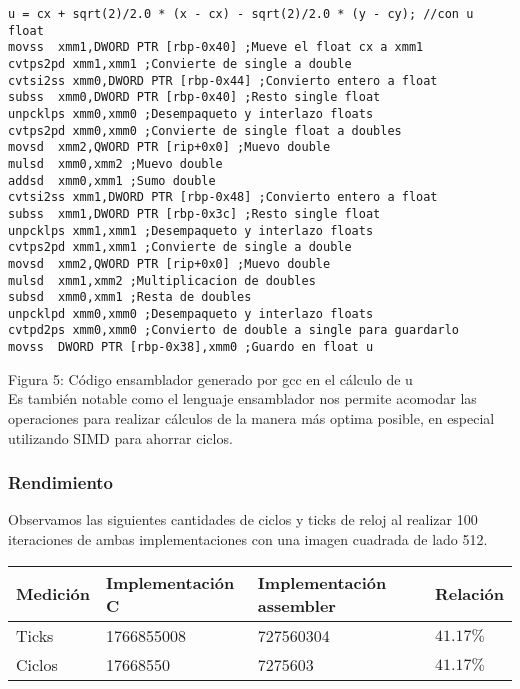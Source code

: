 \begin{verbatim}
u = cx + sqrt(2)/2.0 * (x - cx) - sqrt(2)/2.0 * (y - cy); //con u float
movss  xmm1,DWORD PTR [rbp-0x40] ;Mueve el float cx a xmm1
cvtps2pd xmm1,xmm1 ;Convierte de single a double
cvtsi2ss xmm0,DWORD PTR [rbp-0x44] ;Convierto entero a float
subss  xmm0,DWORD PTR [rbp-0x40] ;Resto single float
unpcklps xmm0,xmm0 ;Desempaqueto y interlazo floats
cvtps2pd xmm0,xmm0 ;Convierte de single float a doubles
movsd  xmm2,QWORD PTR [rip+0x0] ;Muevo double
mulsd  xmm0,xmm2 ;Muevo double
addsd  xmm0,xmm1 ;Sumo double
cvtsi2ss xmm1,DWORD PTR [rbp-0x48] ;Convierto entero a float
subss  xmm1,DWORD PTR [rbp-0x3c] ;Resto single float
unpcklps xmm1,xmm1 ;Desempaqueto y interlazo floats
cvtps2pd xmm1,xmm1 ;Convierte de single a double
movsd  xmm2,QWORD PTR [rip+0x0] ;Muevo double
mulsd  xmm1,xmm2 ;Multiplicacion de doubles
subsd  xmm0,xmm1 ;Resta de doubles
unpcklpd xmm0,xmm0 ;Desempaqueto y interlazo floats
cvtpd2ps xmm0,xmm0 ;Convierto de double a single para guardarlo
movss  DWORD PTR [rbp-0x38],xmm0 ;Guardo en float u
\end{verbatim}

Figura 5: Código ensamblador generado por gcc en el cálculo de u \\

Es también notable como el lenguaje ensamblador nos permite acomodar las operaciones para realizar cálculos de la manera más optima posible, en especial utilizando SIMD para ahorrar ciclos.

\subsubsection{Rendimiento}
Observamos las siguientes cantidades de ciclos y ticks de reloj al realizar 100 iteraciones de ambas implementaciones con una imagen cuadrada de lado 512.
\begin{center}
    \begin{tabular}{|l|l|l|l|}
        \hline
        Medición & Implementación C & Implementación assembler & Relación \\
        \hline
        Ticks    & 1766855008      & 727560304               & $41.17\%$ \\
        Ciclos   & 17668550       & 7275603                & $41.17\%$ \\
        \hline
    \end{tabular}
\end{center}